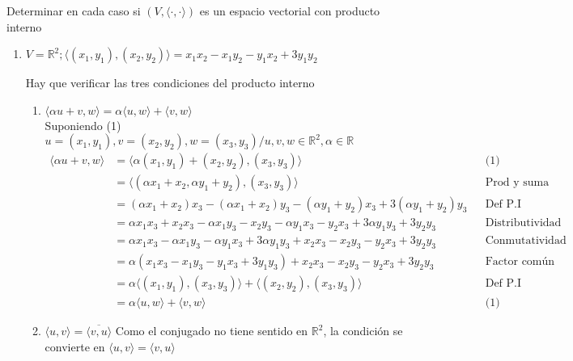 \item Determinar en cada caso si $(V, \langle \cdot, \cdot \rangle)$ es un espacio vectorial con producto interno
    \begin{enumerate}
        \item $V= \mathbb{R}^2; \langle(x_1,y_1),(x_2,y_2)\rangle = x_1 x_2 - x_1 y_2 - y_1 x_2 + 3y_1 y_2$
        \begin{mdframed}[style=s]
                Hay que verificar las tres condiciones del producto interno
                \begin{enumerate}
                    \item $\langle \alpha u + v, w\rangle= \alpha \langle u,w \rangle + \langle v,w\rangle$\\
                        Suponiendo (1) $u=(x_1,y_1), v=(x_2, y_2), w=(x_3,y_3)/ u,v,w\in \mathbb{R}^2, \alpha \in \mathbb{R}$
                        \begin{align*}
                            \langle \alpha u+v,w \rangle &= \langle \alpha(x_1,y_1) + (x_2,y_2),(x_3,y_3)\rangle &&\text{(1)}\\
                            &= \langle (\alpha x_1 + x_2, \alpha y_1 + y_2),(x_3,y_3)\rangle &&\text{Prod y suma vec}\\
                            &= (\alpha x_1 + x_2)x_3 - (\alpha x_1 + x_2)y_3 -(\alpha y_1 + y_2)x_3 + 3(\alpha y_1 + y_2)y_3 &&\text{Def P.I}\\
                            &= \alpha x_1 x_3 + x_2 x_3 - \alpha x_1 y_3 - x_2 y_3 - \alpha y_1 x_3 - y_2 x_3 + 3 \alpha y_1 y_3 + 3 y_2 y_3 &&\text{Distributividad}\\
                            &= \alpha x_1 x_3 - \alpha x_1 y_3 - \alpha y_1 x_3 + 3 \alpha y_1 y_3 + x_2 x_3 - x_2 y_3 - y_2 x_3 + 3 y_2 y_3 &&\text{Conmutatividad}\\
                            &= \alpha( x_1 x_3 - x_1 y_3 -  y_1 x_3 + 3  y_1 y_3) + x_2 x_3 - x_2 y_3 - y_2 x_3 + 3 y_2 y_3 &&\text{Factor común}\\
                            &= \alpha \langle (x_1,y_1), (x_3, y_3)\rangle + \langle(x_2,y_2),(x_3,y_3)\rangle &&\text{Def P.I}\\
                            &= \alpha \langle u,w\rangle + \langle v,w \rangle &&\text{(1)}
                        \end{align*}
                    \item $\langle u,v \rangle = \overline{\langle v,u \rangle}$
                        Como el conjugado no tiene sentido en $\mathbb{R}^2$, la condición se convierte en $\langle u,v \rangle = \langle v,u \rangle$

\end{enumerate}
\end{mdframed}
\end{enumerate}
